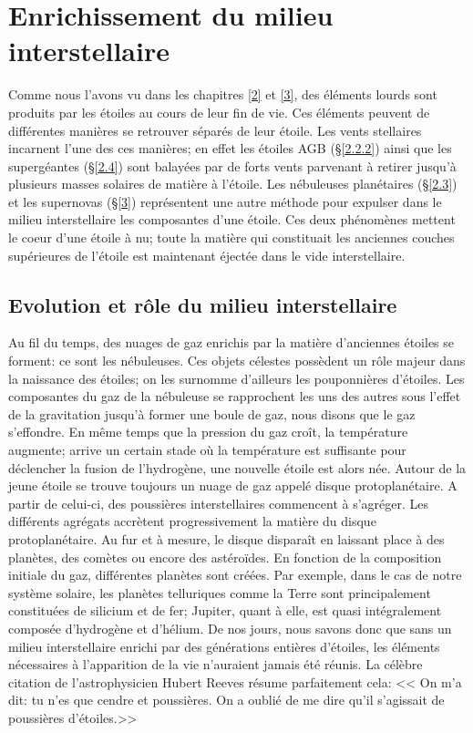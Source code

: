 
\chapterFormatfive

\chapter{Enrichissement du milieu interstellaire}\label{5}

\chapterFormat

Comme nous l'avons vu dans les chapitres \ref{2} et \ref{3}, des éléments lourds sont produits par les étoiles au cours de leur fin de vie. Ces éléments peuvent de différentes manières se retrouver séparés de leur étoile. Les vents stellaires incarnent l'une des ces manières; en effet les étoiles AGB (§\ref{2.2.2}) ainsi que les supergéantes (§\ref{2.4}) sont balayées par de forts vents parvenant à retirer jusqu'à plusieurs masses solaires de matière à l'étoile. Les nébuleuses planétaires (§\ref{2.3}) et les supernovas (§\ref{3}) représentent une autre méthode pour expulser dans le milieu interstellaire les composantes d'une étoile. Ces deux phénomènes mettent le coeur d'une étoile à nu; toute la matière qui constituait les anciennes couches supérieures de l'étoile est maintenant éjectée dans le vide interstellaire. 

\section{Evolution et rôle du milieu interstellaire}\label{5.1}

Au fil du temps, des nuages de gaz enrichis par la matière d'anciennes étoiles se forment: ce sont les nébuleuses. Ces objets célestes possèdent un rôle majeur dans la naissance des étoiles; on les surnomme d'ailleurs les pouponnières d'étoiles. Les composantes du gaz de la nébuleuse se rapprochent les uns des autres sous l'effet de la gravitation jusqu'à former une boule de gaz, nous disons que le gaz s'effondre. En même temps que la pression du gaz croît, la température augmente; arrive un certain stade où la température est suffisante pour déclencher la fusion de l'hydrogène, une nouvelle étoile est alors née. Autour de la jeune étoile se trouve toujours un nuage de gaz appelé disque protoplanétaire. A partir de celui-ci, des poussières interstellaires commencent à s'agréger. Les différents agrégats accrètent progressivement la matière du disque protoplanétaire. Au fur et à mesure, le disque disparaît en laissant place à des planètes, des comètes ou encore des astéroïdes. En fonction de la composition initiale du gaz, différentes planètes sont créées. Par exemple, dans le cas de notre système solaire, les planètes telluriques comme la Terre sont principalement constituées de silicium et de fer; Jupiter, quant à elle, est quasi intégralement composée d'hydrogène et d'hélium. De nos jours, nous savons donc que sans un milieu interstellaire enrichi par des générations entières d'étoiles, les éléments nécessaires à l'apparition de la vie n'auraient jamais été réunis. La célèbre citation de l'astrophysicien Hubert Reeves résume parfaitement cela: << On m'a dit: tu n'es que cendre et poussières. On a oublié de me dire qu'il s'agissait de poussières d'étoiles.>>

